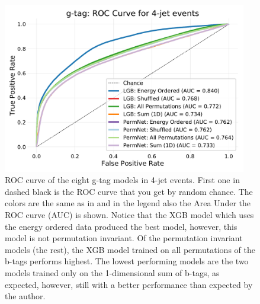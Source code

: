 \begin{figure}
  \includegraphics[width=0.95\textwidth, trim=10 10 10 40, clip]{figures/quarks/gtag_ROC_4_jet-down_sample=1.00-ML_vars=vertex-selection=b-ejet_min=4-n_iter_RS_lgb=99-n_iter_RS_xgb=9-cdot_cut=0.90-version=19.pdf}
  \caption[ROC curve for g-tag in 4-jet events]
          {ROC curve of the eight g-tag models in 4-jet events. First one in dashed black is the ROC curve that you get by random chance. The colors are the same as in  and in the legend also the Area Under the ROC curve (AUC) is shown. 
          Notice that the XGB model which uses the energy ordered data produced the best model, however, this model is not permutation invariant. Of the permutation invariant models (the rest), the XGB model trained on all permutations of the b-tags performs highest. The lowest performing models are the two models trained only on the 1-dimensional sum of b-tags, as expected, however, still with a better performance than expected by the author.  
          } 
  \label{fig:q:roc_gtag_4j}
\end{figure}





